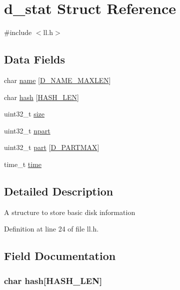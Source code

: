 \hypertarget{structd__stat}{}\section{d\+\_\+stat Struct Reference}
\label{structd__stat}


{\ttfamily \#include $<$ll.\+h$>$}

\subsection*{Data Fields}
\begin{DoxyCompactItemize}
\item 
char \hyperlink{structd__stat_a6f90e58d4eed197561bceea400d4a08c}{name} \mbox{[}\hyperlink{tfs__format_8c_ab30348e352fc02b3ad044bfe2577ef18}{D\+\_\+\+N\+A\+M\+E\+\_\+\+M\+A\+X\+L\+E\+N}\mbox{]}
\item 
char \hyperlink{structd__stat_ab35b5b3213861b7367e9ca2346437672}{hash} \mbox{[}\hyperlink{utils_8h_a1c98a0f4b02f4283af4233cf6e3ad121}{H\+A\+S\+H\+\_\+\+L\+E\+N}\mbox{]}
\item 
uint32\+\_\+t \hyperlink{structd__stat_ab2c6b258f02add8fdf4cfc7c371dd772}{size}
\item 
uint32\+\_\+t \hyperlink{structd__stat_ac84778576a3eb0108d6839c8f24f373c}{npart}
\item 
uint32\+\_\+t \hyperlink{structd__stat_a20c99bd7a6449e2daebe9beca4aa9a81}{part} \mbox{[}\hyperlink{ll_8h_a318f8a09c916fffa98b557818d12ec0a}{D\+\_\+\+P\+A\+R\+T\+M\+A\+X}\mbox{]}
\item 
time\+\_\+t \hyperlink{structd__stat_ab842bdb7d02be824fb48613032b4ff36}{time}
\end{DoxyCompactItemize}


\subsection{Detailed Description}
A structure to store basic disk information 

Definition at line 24 of file ll.\+h.



\subsection{Field Documentation}
\hypertarget{structd__stat_ab35b5b3213861b7367e9ca2346437672}{}
\subsubsection[{hash}]{\setlength{\rightskip}{0pt plus 5cm}char hash\mbox{[}{\bf H\+A\+S\+H\+\_\+\+L\+E\+N}\mbox{]}}\label{structd__stat_ab35b5b3213861b7367e9ca2346437672}


